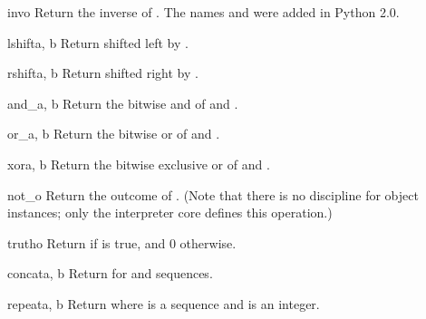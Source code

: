 \begin{funcdesc}{inv}{o}
Return the inverse of .  The names  and
 were added in Python 2.0.
\end{funcdesc}

\begin{funcdesc}{lshift}{a, b}
Return  shifted left by .
\end{funcdesc}

\begin{funcdesc}{rshift}{a, b}
Return  shifted right by .
\end{funcdesc}

\begin{funcdesc}{and_}{a, b}
Return the bitwise and of  and .
\end{funcdesc}

\begin{funcdesc}{or_}{a, b}
Return the bitwise or of  and .
\end{funcdesc}

\begin{funcdesc}{xor}{a, b}
Return the bitwise exclusive or of  and .
\end{funcdesc}

\begin{funcdesc}{not_}{o}
Return the outcome of  .  (Note that there is no
 discipline for object instances; only the
interpreter core defines this operation.)
\end{funcdesc}

\begin{funcdesc}{truth}{o}
Return  if  is true, and 0 otherwise.
\end{funcdesc}

\begin{funcdesc}{concat}{a, b}
Return  \code{+}  for  and  sequences.
\end{funcdesc}

\begin{funcdesc}{repeat}{a, b}
Return  \code{*}  where  is a sequence and
 is an integer.
\end{funcdesc}

